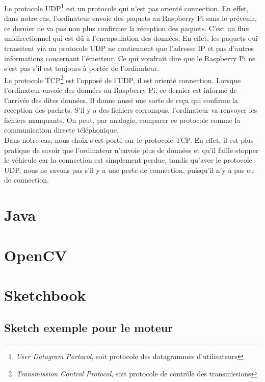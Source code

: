 \documentclass[a4paper,11pt]{report}
\begin{document}
{Le protocole UDP\footnote{\textit{User Datagram Portocol}, soit protocole des datagrammes d'utilisateurs} est un protocole qui n'est pas orienté connection. En effet, dans notre cas, l'ordinateur envoie des paquets au Raspberry Pi sans le prévenir, ce dernier ne va pas non plus confirmer la réception des paquets. C'est un flux unidirectionnel qui est dû à l'encapsulation des données. En effet, les paquets qui transitent via un protocole UDP ne contiennent que l'adresse IP et pas d'autres informations concernant l'émetteur. Ce qui voudrait dire que le Raspberry Pi ne s'est pas s'il est toujours à portée de l'ordinateur. \\
Le protocole TCP\footnote{\textit{Transmission Control Protocol}, soit protocole de contrôle des transmissions} est l'opposé de l'UDP, il est orienté connection. Lorsque l'ordinateur envoie des données au Raspberry Pi, ce dernier est informé de l'arrivée des dites données. Il donne aussi une sorte de reçu qui confirme la reception des packets. S'il y a des fichiers corrompus, l'ordinateur va renvoyer les fichiers manquants. On peut, par analogie, comparer ce protocole comme la communication directe téléphonique.\\
Dans notre cas, nous choix s'est porté sur le protocole TCP. En effet, il est plus pratique de savoir que l'ordinateur n'envoie plus de données et qu'il faille stopper le véhicule car la connection est simplement perdue, tandis qu'avec le protocole UDP, nous ne savons pas s'il y a une perte de connection, puisqu'il n'y a pas eu de connection.  


\section{Java}


\section{OpenCV}




\clearpage

\appendix

\section{Sketchbook}

\subsection{Sketch exemple pour le moteur}


}
\end{document}
